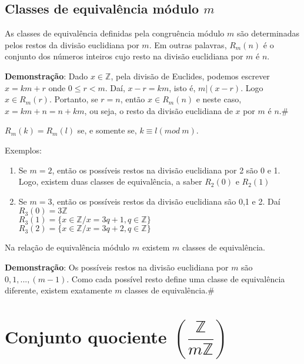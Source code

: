 \subsection{Classes de equivalência módulo $m$}

\begin{proposicao} As classes de equivalência definidas pela congruência módulo $m$ são determinadas pelos restos da divisão euclidiana por $m$. Em outras palavras, $R_{m}(n)$ é o conjunto dos números inteiros cujo resto na divisão euclidiana por $m$ é $n$.\end{proposicao}

\textbf{Demonstração}: Dado $x\in\mathbb{Z}$, pela divisão de Euclides, podemos escrever $x=km+r$ onde $0\leq r < m$. Daí, $x-r=km$, isto é, $m|(x-r)$. Logo $x\in R_{m}(r)$. Portanto, se $r=n$, então $x\in R_{m}(n)$ e neste caso, $x=km+n=n+km$, ou seja, o resto da divisão euclidiana de $x$ por $m$ é $n$.\#

\begin{corolario} $R_{m}(k)=R_{m}(l)$ se, e somente se, $k\equiv l(mod\ m)$.\end{corolario}

Exemplos:
\begin{enumerate}
\item Se $m=2$, então os possíveis restos na divisão euclidiana por 2 são 0 e 1. Logo, existem duas classes de equivalência, a saber $R_{2}(0)$ e $R_{2}(1)$
\item Se $m=3$, então os possíveis restos da divisão euclidiana são 0,1 e 2. Daí\\
$R_{3}(0)=3\mathbb{Z}$\\
$R_{3}(1)=\{x\in\mathbb{Z}/x=3q+1,q\in\mathbb{Z}\}$\\
$R_{3}(2)=\{x\in\mathbb{Z}/x=3q+2,q\in\mathbb{Z}\}$

\end{enumerate}

\begin{proposicao} Na relação de equivalência módulo $m$ existem $m$ classes de equivalência.\end{proposicao}

\textbf{Demonstração}: Os possíveis restos na divisão euclidiana por $m$ são $0,1,...,(m-1)$. Como cada possível resto define uma classe de equivalência diferente, existem exatamente $m$ classes de equivalência.\#

\section{Conjunto quociente $\left(\dfrac{\mathbb{Z}}{m\mathbb{Z}}\right)$}


